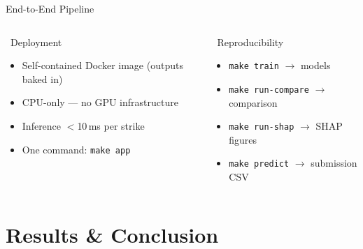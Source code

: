\documentclass[aspectratio=169,10pt]{beamer}
\begin{document}
\begin{frame}{End-to-End Pipeline}
\begin{columns}[T]
  \end{columns}
  \vspace{3pt}
  \begin{columns}[T]
      \begin{block}{\faDocker\ Deployment}
        \begin{itemize}
          \item Self-contained Docker image (outputs baked in)
          \item CPU-only --- no GPU infrastructure
          \item Inference \(<\)10\,ms per strike
          \item One command: \texttt{make app}
        \end{itemize}
      \end{block}
      \begin{block}{\faRecycle\ Reproducibility}
        \begin{itemize}
          \item \texttt{make train} \(\to\) models
          \item \texttt{make run-compare} \(\to\) comparison
          \item \texttt{make run-shap} \(\to\) SHAP figures
          \item \texttt{make predict} \(\to\) submission CSV
        \end{itemize}
      \end{block}
  \end{columns}
\end{frame}

\section{Results \& Conclusion}
\end{document}
